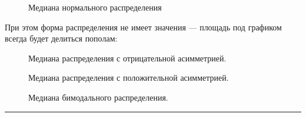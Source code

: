 \documentclass[
  letterpaper,
]{scrbook}
\theoremstyle{definition}
\theoremstyle{remark}
\begin{document}
\begin{figure}


\caption{\label{fig-median-norm}Медиана нормального распределения}

\end{figure}%

При этом форма распределения не имеет значения --- площадь под графиком
всегда будет делиться пополам:

\begin{figure}


\caption{\label{fig-median-left-skew}Медиана распределения с
отрицательной асимметрией.}

\end{figure}%

\begin{figure}


\caption{\label{fig-median-right-skew}Медиана распределения с
положительной асимметрией.}

\end{figure}%

\begin{figure}


\caption{\label{fig-median-bimodal}Медиана бимодального распределения.}

\end{figure}%

\begin{center}\rule{0.5\linewidth}{0.5pt}\end{center}
\end{document}
